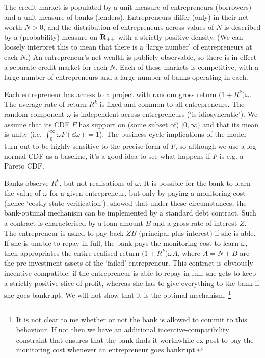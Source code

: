 \documentclass[11pt,letterpaper,reqno,oneside]{article}
\begin{document}
The credit market is populated by a unit measure of entrepreneurs (borrowers) and a unit measure of banks (lenders). Entrepreneurs differ (only) in their net worth $N > 0$, and the distribution of entrepreneurs across values of $N$ is described by a (probability) measure on $\mathbf{R}_{++}$ with a strictly positive density. (We can loosely interpret this to mean that there is a `large number' of entrepreneurs at each $N$.) An entrepreneur's net wealth is publicly observable, so there is in effect a separate credit market for each $N$. Each of these markets is competitive, with a large number of entrepreneurs and a large number of banks operating in each.

Each entrepreneur has access to a project with random gross return $\bigl(1+R^k\bigr) \omega$. The average rate of return $R^k$ is fixed and common to all entrepreneurs. The random component $\omega$ is independent across entrepreneurs (`is idiosyncratic'). We assume that its CDF $F$ has support on (some subset of) $[0,\infty)$ and that its mean is unity (i.e. $\int_0^\infty \omega F( \dd \omega ) = 1$). The business cycle implications of the model turn out to be highly sensitive to the precise form of $F$, so although we use a log-normal CDF as a baseline, it's a good idea to see what happens if $F$ is e.g. a Pareto CDF.

Banks observe $R^k$, but not realisations of $\omega$. It is possible for the bank to learn the value of $\omega$ for a given entrepreneur, but only by paying a monitoring cost (hence `costly state verification'). \textcite{Townsend1979} showed that under these circumstances, the bank-optimal mechanism can be implemented by a standard debt contract. Such a contract is characterised by a loan amount $B$ and a gross rate of interest $Z$. The entrepreneur is asked to pay back $ZB$ (principal plus interest) if she is able. If she is unable to repay in full, the bank pays the monitoring cost to learn $\omega$, then appropriates the entire realised return $\bigl(1+R^k\bigr) \omega A$, where $A=N+B$ are the pre-investment assets of the `failed' entrepreneur. This contract is obviously incentive-compatible: if the entrepreneur is able to repay in full, she gets to keep a strictly positive slice of profit, whereas she has to give everything to the bank if she goes bankrupt. We will not show that it is the optimal mechanism.%
	\footnote{It is not clear to me whether or not the bank is allowed to commit to this behaviour. If not then we have an additional incentive-compatibility constraint that ensures that the bank finds it worthwhile ex-post to pay the monitoring cost whenever an entrepreneur goes bankrupt.}
\end{document}
